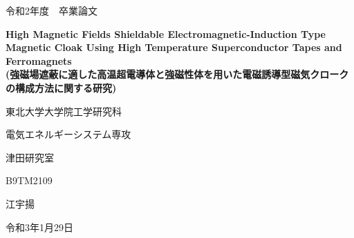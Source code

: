 \begin{titlepage}
  \begin{center}
    \vspace*{0.5cm}
    {\Large 令和2年度　卒業論文}

    \vspace*{2cm}

    \Huge{\bf
    \vspace{2cm}
    High Magnetic Fields Shieldable Electromagnetic-Induction Type Magnetic Cloak Using High Temperature Superconductor Tapes and Ferromagnets\\
    (強磁場遮蔽に適した高温超電導体と強磁性体を用いた電磁誘導型磁気クロークの構成方法に関する研究)
    }
    \Large{

    \vspace*{2cm}
    東北大学大学院工学研究科

    \vspace*{0.3cm}
    電気エネルギーシステム専攻

    \vspace*{0.3cm}
    津田研究室

    \vspace*{0.3cm}
    B9TM2109

    \vspace*{0.3cm}
    江宇揚
    }

    \vspace*{2.5cm}

    令和3年1月29日
  \end{center}
\end{titlepage}
